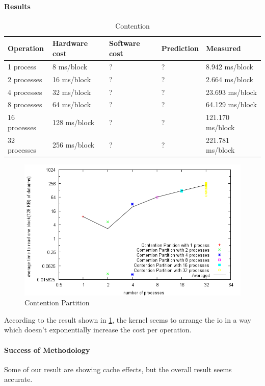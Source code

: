 \paragraph{Results}
\begin{table}
\begin{center}
\begin{tabular}{| l | l | l | l | l |}
\hline
Operation & Hardware cost & Software cost & Prediction & Measured \\
\hline
1 process	& 8 ms/block	& ?       & ?        & 8.942    ms/block \\ \hline
2 processes	& 16 ms/block	& ?       & ?        & 2.664    ms/block \\ \hline
4 processes	& 32 ms/block	& ?       & ?        & 23.693    ms/block \\ \hline
8 processes	& 64 ms/block	& ?       & ?        & 64.129    ms/block \\ \hline
16 processes	& 128 ms/block	& ?       & ?        & 121.170    ms/block \\ \hline
32 processes	& 256 ms/block	& ?       & ?        & 221.781    ms/block \\ \hline

\end{tabular}
\end{center}
\caption{Contention\label{tab:contention}}
\end{table}

\begin{figure}[h]
\begin{center}
\includegraphics[scale=0.8]{contentionPartitionImage}
\end{center}
\caption {Contention Partition\label{fig:contention-partition}}
\end{figure}

According to the result shown in \ref{tab:contention}, the kernel seems to
arrange the io in a way which doesn't exponentially increase the cost per
operation.

\paragraph{Success of Methodology}
Some of our result are showing cache effects, but the overall result seems
accurate.
